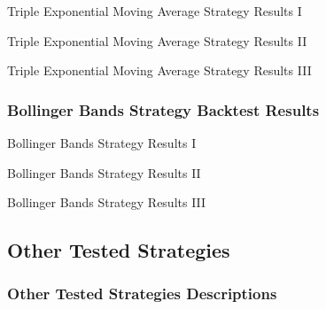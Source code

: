 \begin{table}[H]
    \centering
    \caption{Triple Exponential Moving Average Strategy Results I}
\end{table}
\begin{table}[H]
    \centering
    \caption{Triple Exponential Moving Average Strategy Results II}
\end{table}
\begin{table}[H]
    \centering
    \caption{Triple Exponential Moving Average Strategy Results III}
\end{table}

\subsubsection{Bollinger Bands Strategy Backtest Results}

\begin{table}[H]
    \centering
    \caption{Bollinger Bands Strategy Results I}
\end{table}
\begin{table}[H]
    \centering
    \caption{Bollinger Bands Strategy Results II}
\end{table}
\begin{table}[H]
    \centering
    \caption{Bollinger Bands Strategy Results III}
\end{table}

\subsection{Other Tested Strategies}
\label{chap:other-strategy-results}

\subsubsection{Other Tested Strategies Descriptions}

